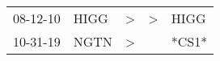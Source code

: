 \begin{supertabular}{lllll}
 08-12-10 &  HIGG &  \textgreater &  \textgreater &   HIGG \\
 10-31-19 &  NGTN &  \textgreater &               &  *CS1* \\
\end{supertabular}
